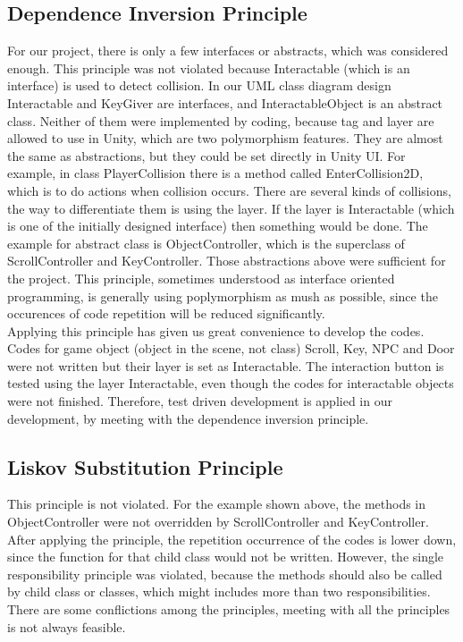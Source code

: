 \documentclass[12pt, a4paper]{report}
\begin{document}
		\subsection {Dependence Inversion Principle}
			For our project, there is only a few interfaces or abstracts, which was considered enough. This principle was not violated because Interactable (which is an interface) is used to detect collision. In our UML class diagram design Interactable and KeyGiver are interfaces, and InteractableObject is an abstract class. Neither of them were implemented by coding, because tag and layer are allowed to use in Unity, which are two polymorphism features. They are almost the same as abstractions, but they could be set directly in Unity UI. For example, in class PlayerCollision there is a method called EnterCollision2D, which is to do actions when collision occurs. There are several kinds of collisions, the way to differentiate them is using the layer. If the layer is Interactable (which is one of the initially designed interface) then something would be done. The example for abstract class is ObjectController, which is the superclass of ScrollController and KeyController. Those abstractions above were sufficient for the project. This principle, sometimes understood as interface oriented programming, is generally using poplymorphism as mush as possible, since the occurences of code repetition will be reduced significantly.\\
			Applying this principle has given us great convenience to develop the codes. Codes for game object (object in the scene, not class) Scroll, Key, NPC and Door were not written but their layer is set as Interactable. The interaction button is tested using the layer Interactable, even though the codes for interactable objects were not finished. Therefore, test driven development is applied in our development, by meeting with the dependence inversion principle.\\

		\subsection {Liskov Substitution Principle}
			This principle is not violated. For the example shown above, the methods in ObjectController were not overridden by ScrollController and KeyController. After applying the principle, the repetition occurrence of the codes is lower down, since the function for that child class would not be written. However, the single responsibility principle was violated, because the methods should also be called by child class or classes, which might includes more than two responsibilities. There are some conflictions among the principles, meeting with all the principles is not always feasible.\\
\end{document}
